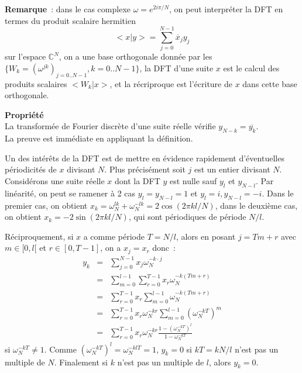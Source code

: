 \documentclass[a4paper,11pt]{article}
\begin{document}
\begin{giacjshere}
{\bf Remarque}~: dans le cas complexe $\omega=e^{2i\pi/N}$, 
on peut interpr\'eter la DFT
en termes du produit scalaire hermitien
$$ <x|y>=\sum_{j=0}^{N-1} \overline{x}_j y_j$$
sur l'espace $\mathbb{C}^N$, on a une base orthogonale donn\'ee par 
les $\{ W_k=(\omega^{jk})_{j=0..N-1}, k=0..N-1\}$, la DFT d'une suite $x$ est le calcul
des produits scalaires $<W_k|x>$, et la r\'ecriproque est l'\'ecriture
de $x$ dans cette base orthogonale.


{\bf Propriété}\\
La transformée de Fourier discrète d'une suite réelle vérifie
$y_{N-k}=\overline{y_k}$.\\
La preuve est immédiate en appliquant la définition.

Un des intérêts de la DFT est de mettre en évidence rapidement
d'éventuelles périodicités de $x$ divisant $N$. Plus précisément
soit $j$ est un entier divisant $N$. Considérons une suite réelle $x$ dont
la DFT $y$ est nulle sauf $y_l$ et $y_{N-l}$. Par linéarité, on
peut se ramener à 2 cas $y_l=y_{N-l}=1$ et $y_l=i, y_{N-l}=-i$. Dans
le premier cas, on obtient $x_k=\omega_N^{lk}+\omega_N^{-lk}=2\cos(2\pi kl/N)$,
dans le deuxième cas, on obtient $x_k=-2\sin(2\pi kl/N)$, qui sont périodiques
de période $N/l$.

Réciproquement, si $x$ a comme période $T=N/l$, alors en posant
$j=T m + r$ avec $m\in[0,l[$ et $r\in[0,T-1]$, on a
$x_j=x_r$ donc~:
\begin{eqnarray*}
 y_k &=&\sum_{j=0}^{N-1} x_j \omega_N^{-k\cdot j} \\
&=&\sum_{m=0}^{l-1} \sum_{r=0}^{T-1} x_r \omega_N^{-k (T m+r)} \\
&=&\sum_{r=0}^{T-1} x_r \sum_{m=0}^{l-1} \omega_N^{-k (T m+r)} \\
&=& \sum_{r=0}^{T-1} x_r \omega_N^{-kr} \sum_{m=0}^{l-1}
(\omega_N^{-kT})^m \\
&=& \sum_{r=0}^{T-1} x_r \omega_N^{-kr} 
\frac{1-(\omega_N^{-kT})^l}{1-\omega_N^{-kT}}
\end{eqnarray*}
si $\omega_N^{-kT} \neq 1$. Comme $(\omega_N^{-kT})^l=\omega_N^{-klT}=1$,
$y_k=0$ si $kT=kN/l$ n'est pas un multiple de $N$. 
Finalement si $k$ n'est pas un multiple de $l$, alors $y_k=0$.


\end{giacjshere}
\end{document}
